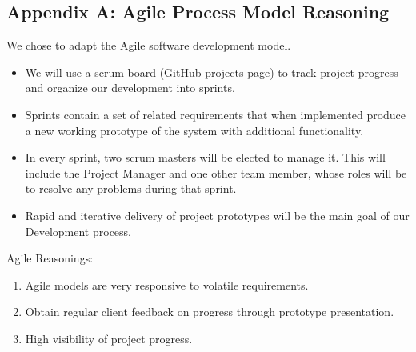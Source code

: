 \documentclass[11pt, a4paper]{article}
\begin{document}
\begin{flushleft}
\subsection{Appendix A: Agile Process Model Reasoning}
We chose to adapt the Agile software development model. 
\begin{itemize}
	\item We will use a scrum board (GitHub projects page) to track project progress and organize our development into sprints.
    \item Sprints contain a set of related requirements that when implemented produce a new working prototype of the system with additional functionality. 
    \item In every sprint, two scrum masters will be elected to manage it. This will include the Project Manager and one other team member, whose roles will be to resolve any problems during that sprint. 
    \item Rapid and iterative delivery of project prototypes will be the main goal of our Development process.
\end{itemize}
Agile Reasonings:
\begin{enumerate}
	\item Agile models are very responsive to volatile requirements.
    \item Obtain regular client feedback on progress through prototype presentation.
    \item High visibility of project progress.
\end{enumerate}



\end{flushleft}
\end{document}
